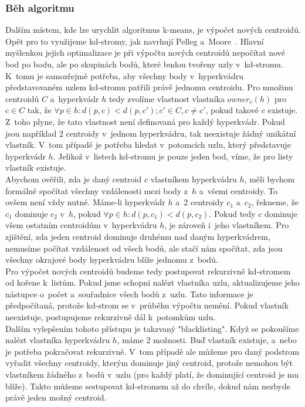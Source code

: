 \subsubsection{Běh algoritmu}
Dalším místem, kde lze urychlit algoritmus k-means, je výpočet nových centroidů. Opět pro to využijeme kd-stromy, jak navrhují Pelleg a~Moore~\cite{pelleg99}. Hlavní myšlenkou jejich optimalizace je při výpočtu nových centroidů nepočítat nové bod po bodu, ale po skupinách bodů, které budou tvořeny uzly v~kd-stromu. K~tomu je samozřejmě potřeba, aby všechny body v~hyperkvádru představovaném uzlem kd-stromu patřili právě jednomu centroidu. Pro množinu centroidů $C$ a~hyperkvádr $h$ tedy zvolíme vlastnost vlastníka $owner_c(h)$ pro $c \in C$ tak, že $\forall p \in h: d(p,c) < d(p,c'); c' \in C, c \ne c'$, pokud takové $c$ existuje. Z~toho plyne, že tato vlastnost není definovaná pro každý hyperkvádr. Pokud jsou například 2 centroidy v~jednom hyperkvádru, tak neexistuje žádný unikátní vlastník. V~tom případě je potřeba hledat v~potomcích uzlu, který představuje hyperkvádr $h$. Jelikož v~listech kd-stromu je pouze jeden bod, víme, že pro listy vlastník existuje.\\

Abychom ověřili, zda je daný centroid $c$ vlastníkem hyperkvádru $h$, měli bychom formálně spočítat všechny vzdálenosti mezi body z~$h$ a~všemi centroidy. To ovšem není vždy nutné. Máme-li hyperkvádr $h$ a~2 centroidy $c_1$ a~$c_2$, řekneme, že $c_1$ dominuje $c_2$ v~$h$, pokud $\forall p \in h: d(p,c_1) < d(p,c_2)$. Pokud tedy $c$ dominuje všem ostatním centroidům v~hyperkvádru $h$, je zároveň i~jeho vlastníkem. Pro zjištění, zda jeden centroid dominuje druhému nad daným hyperkvádrem, nemusíme počítat vzdálenost od všech bodů, ale stačí nám spočítat, zda jsou všechny okrajové body hyperkvádru blíže jednomu z~bodů.\\

Pro výpočet nových centroidů budeme tedy postupovat rekurzivně kd-stromem od kořene k~listům. Pokud jsme schopni nalézt vlastníka uzlu, aktualizujeme jeho nástupce o~počet a~souřadnice všech bodů z~uzlu. Tato informace je předpočítaná, protože kd-strom se v~průběhu výpočtu nemění. Pokud vlastník neexistuje, postupujeme rekurzivně dál k~potomkům uzlu.\\

Dalším vylepšením tohoto přístupu je takzvaný "blacklisting". Když se pokoušíme nalézt vlastníka hyperkvádru $h$, máme 2 možnosti. Buď vlastník existuje, a~nebo je potřeba pokračovat rekurzivně. V~tom případě ale můžeme pro daný podstrom vyřadit všechny centroidy, kterým dominuje jiný centroid, protože nemohou být vlastníkem žádného z~bodů v~uzlu (pro každý platí, že dominující centroid je mu blíže). Takto můžeme sestupovat kd-stromem až do chvíle, dokud nám nezbyde právě jeden možný centroid.\\

